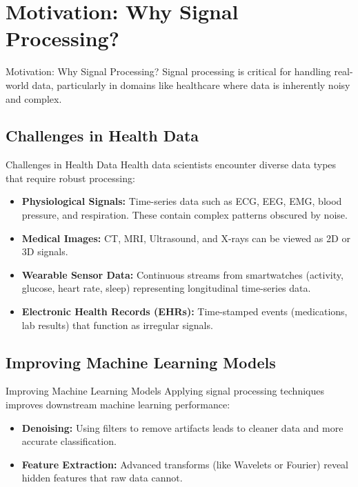\documentclass[aspectratio=169]{beamer}
\begin{document}
\section{Motivation: Why Signal Processing?}
\begin{frame}{Motivation: Why Signal Processing?}
Signal processing is critical for handling real-world data, particularly in domains like healthcare where data is inherently noisy and complex.
\end{frame}

\subsection{Challenges in Health Data}
\begin{frame}{Challenges in Health Data}
Health data scientists encounter diverse data types that require robust processing:
\begin{itemize}
    \item \textbf{Physiological Signals:} Time-series data such as ECG, EEG, EMG, blood pressure, and respiration. These contain complex patterns obscured by noise.
    \item \textbf{Medical Images:} CT, MRI, Ultrasound, and X-rays can be viewed as 2D or 3D signals.
    \item \textbf{Wearable Sensor Data:} Continuous streams from smartwatches (activity, glucose, heart rate, sleep) representing longitudinal time-series data.
    \item \textbf{Electronic Health Records (EHRs):} Time-stamped events (medications, lab results) that function as irregular signals.
\end{itemize}
\end{frame}

\subsection{Improving Machine Learning Models}
\begin{frame}{Improving Machine Learning Models}
Applying signal processing techniques improves downstream machine learning performance:
\begin{itemize}
    \item \textbf{Denoising:} Using filters to remove artifacts leads to cleaner data and more accurate classification.
    \item \textbf{Feature Extraction:} Advanced transforms (like Wavelets or Fourier) reveal hidden features that raw data cannot.
\end{itemize}
\end{frame}
\end{document}
